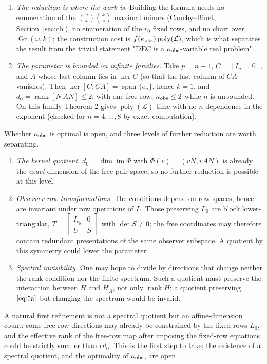 \documentclass[journal]{IEEEtran}
\theoremstyle{plainn}
\begin{document}
\begin{enumerate}
\item \emph{The reduction is where the work is.} Building the formula needs no enumeration of the $\binom q\omega\binom k\omega$ maximal minors (Cauchy--Binet, Section~\ref{sec:cb}), no enumeration of the $r_0$ fixed rows, and no chart over $\operatorname{Gr}(\omega,k)$; the construction cost is $f(\kappa_{\rm obs})\operatorname{poly}(\mathcal L)$, which is what separates the result from the trivial statement "$\mathrm{DEC}$ is a $\kappa_{\rm obs}$-variable real problem".
\item \emph{The parameter is bounded on infinite families.} Take $p=n-1$, $C=[I_{n-1}\ 0]$, and $A$ whose last column lies in $\ker C$ (so that the last column of $CA$ vanishes). Then $\ker[C;CA]=\operatorname{span}\{e_n\}$, hence $k=1$, and $d_0=\operatorname{rank}[N\ AN]\le2$; with one free row, $\kappa_{\rm obs}\le2$ while $n$ is unbounded. On this family Theorem 2 gives $\operatorname{poly}(\mathcal L)$ time with no $n$-dependence in the exponent (checked for $n=4,\dots,8$ by exact computation).
\end{enumerate}
Whether $\kappa_{\rm obs}$ is optimal is open, and three levels of further reduction are worth separating.

\begin{enumerate}
\item \emph{The kernel quotient.} $d_0=\dim\operatorname{im}\Phi$ with $\Phi(v)=(vN,vAN)$ is already the \emph{exact} dimension of the free-pair space, so no further reduction is possible at this level.
\item \emph{Observer-row transformations.} The conditions depend on row spaces, hence are invariant under row operations of $L$. Those preserving $L_0$ are block lower-triangular, $T=\begin{bmatrix}I_{r_0}&0\\ U&S\end{bmatrix}$ with $\det S\ne0$; the free coordinates may therefore contain redundant presentations of the same observer subspace. A quotient by this symmetry could lower the parameter.
\item \emph{Spectral invisibility.} One may hope to divide by directions that change neither the rank condition nor the finite spectrum. Such a quotient must preserve the interaction between $H$ and $H_A$, not only $\operatorname{rank}H$; a quotient preserving $\eqref{eq:5a}$ but changing the spectrum would be invalid.
\end{enumerate}
A natural first refinement is not a spectral quotient but an affine-dimension count: some free-row directions may already be constrained by the fixed rows $L_0$, and the effective rank of the free-row map after imposing the fixed-row equations could be strictly smaller than $rd_0$. This is the first step to take; the existence of a spectral quotient, and the optimality of $\kappa_{\rm obs}$, are open.
\end{document}
